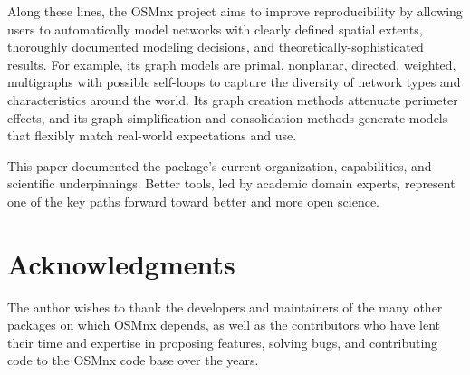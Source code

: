 \documentclass[12pt,letterpaper]{article} %
\begin{document}
Along these lines, the OSMnx project aims to improve reproducibility by allowing users to automatically model networks with clearly defined spatial extents, thoroughly documented modeling decisions, and theoretically-sophisticated results. For example, its graph models are primal, nonplanar, directed, weighted, multigraphs with possible self-loops to capture the diversity of network types and characteristics around the world. Its graph creation methods attenuate perimeter effects, and its graph simplification and consolidation methods generate models that flexibly match real-world expectations and use.

This paper documented the package's current organization, capabilities, and scientific underpinnings. Better tools, led by academic domain experts, represent one of the key paths forward toward better and more open science.

\section*{Acknowledgments}

The author wishes to thank the developers and maintainers of the many other packages on which OSMnx depends, as well as the contributors who have lent their time and expertise in proposing features, solving bugs, and contributing code to the OSMnx code base over the years.


\setlength{\bibsep}{0.00cm plus 0.05cm} %


\end{document}
